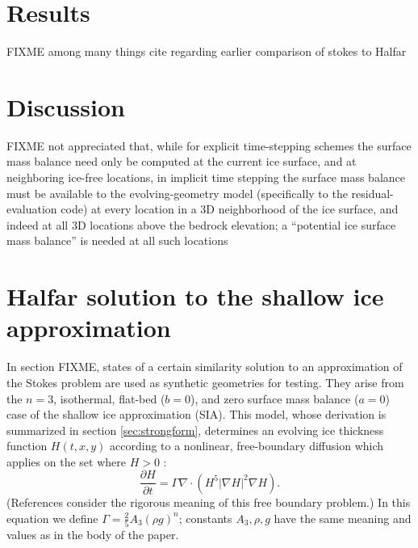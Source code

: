 \documentclass[letterpaper,final,12pt,reqno]{amsart}
\newcommand{\grad}{\nabla}
\newcommand{\Div}{\nabla\cdot}
\begin{document}
\section{Results}

FIXME among many things cite \cite{LeysingerGudmundsson2004} regarding earlier comparison of stokes to Halfar


\section{Discussion}

FIXME not appreciated that, while for explicit time-stepping schemes the surface mass balance need only be computed at the current ice surface, and at neighboring ice-free locations, in implicit time stepping the surface mass balance must be available to the evolving-geometry model (specifically to the residual-evaluation code) at every location in a 3D neighborhood of the ice surface, and indeed at all 3D locations above the bedrock elevation; a ``potential ice surface mass balance'' is needed at all such locations

\appendix
\section{Halfar solution to the shallow ice approximation}

In section FIXME, states of a certain similarity solution to an approximation of the Stokes problem are used as synthetic geometries for testing.  They arise from the $n=3$, isothermal, flat-bed ($b=0$), and zero surface mass balance ($a=0$) case of the shallow ice approximation (SIA).  This model, whose derivation is summarized in section \ref{sec:strongform}, determines an evolving ice thickness function $H(t,x,y)$ according to a nonlinear, free-boundary diffusion which applies on the set where $H>0$ \cite{Fowler1997}:
\begin{equation}
\frac{\partial H}{\partial t} = \Gamma \Div \left(H^5 |\grad H|^2 \grad H\right). \label{sia}
\end{equation}
(References \cite{Bueler2016,JouvetBueler2012} consider the rigorous meaning of this free boundary problem.)  In this equation we define $\Gamma = \frac{2}{5} A_3 (\rho g)^n$; constants $A_3,\rho,g$ have the same meaning and values as in the body of the paper.
\end{document}
